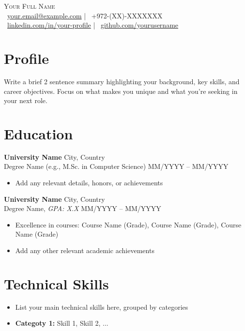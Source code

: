\documentclass[a4paper,11pt]{article}
\newcommand{\contactInfo}[1]{\textcolor{mainblue}{\small#1}}
\newcommand{\runsubsection}[1]{\textcolor{mainblue}{\bfseries #1}\normalfont}
\newcommand{\location}[1]{\textcolor{maingray}{\small #1}}
\begin{document}
\begin{center}
    {\Huge \scshape Your Full Name} \\[5pt]
    \contactInfo{
        \faEnvelope\ \href{mailto:your.email@example.com}{your.email@example.com} \quad | \quad 
        \faPhone\ +972-(XX)-XXXXXXX \\[5pt]
        \faLinkedin\ \href{https://linkedin.com/in/your-profile}{linkedin.com/in/your-profile} \quad | \quad
        \faGithub\ \href{https://github.com/yourusername}{github.com/yourusername}
    }
\end{center}

\section{Profile}
Write a brief 2 sentence summary highlighting your background, key skills, and career objectives. Focus on what makes you unique and what you're seeking in your next role.

\section{Education}
\runsubsection{University Name} \hfill \location{City, Country}\\[2pt]
Degree Name (e.g., M.Sc. in Computer Science) \hfill \location{MM/YYYY -- MM/YYYY}
\begin{itemize}
    \item Add any relevant details, honors, or achievements
\end{itemize}

\runsubsection{University Name} \hfill \location{City, Country}\\[2pt]
Degree Name, \textit{GPA: X.X} \hfill \location{MM/YYYY -- MM/YYYY}
\begin{itemize}
    \item Excellence in courses: Course Name (Grade), Course Name (Grade), Course Name (Grade)
    \item Add any other relevant academic achievements
\end{itemize}

\section{Technical Skills}
\begin{itemize}
    \item List your main technical skills here, grouped by categories
    \item \textbf{Categoty 1:} Skill 1, Skill 2, ...
\end{itemize}
\end{document}
